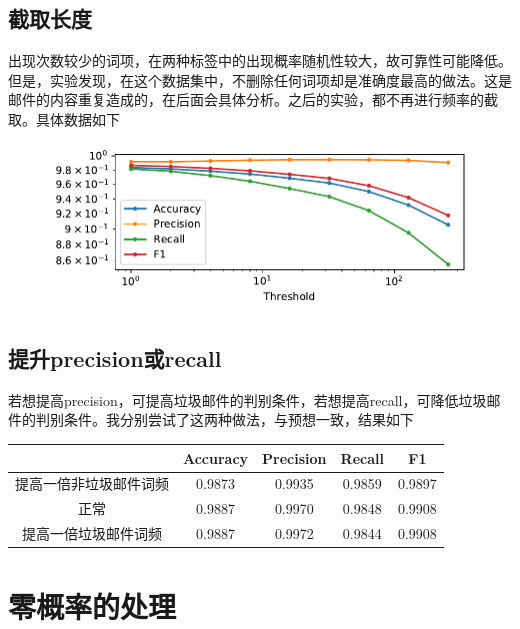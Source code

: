 \documentclass{article}
\begin{document}
\subsection{截取长度}
出现次数较少的词项，在两种标签中的出现概率随机性较大，故可靠性可能降低。但是，实验发现，在这个数据集中，不删除任何词项却是准确度最高的做法。这是邮件的内容重复造成的，在后面会具体分析。之后的实验，都不再进行频率的截取。具体数据如下
\begin{figure}[h]
    \centering
    \includegraphics{figure/trunc.pdf}
    \label{fig:trunc}
\end{figure}

\subsection{提升precision或recall}
若想提高precision，可提高垃圾邮件的判别条件，若想提高recall，可降低垃圾邮件的判别条件。我分别尝试了这两种做法，与预想一致，结果如下
\begin{table}[h]
\center
\label{tab:rate}
\begin{tabular}[]{|c|c|c|c|c|}
\hline
&Accuracy & Precision & Recall & F1 \\ \hline

    提高一倍非垃圾邮件词频 & 0.9873 & 0.9935 & 0.9859 & 0.9897 \\ \hline
    正常&0.9887 & 0.9970 & 0.9848 & 0.9908 \\ \hline
    提高一倍垃圾邮件词频 & 0.9887 & 0.9972 & 0.9844 & 0.9908 \\ \hline

\end{tabular}
\end{table}

\section{零概率的处理}
\end{document}
